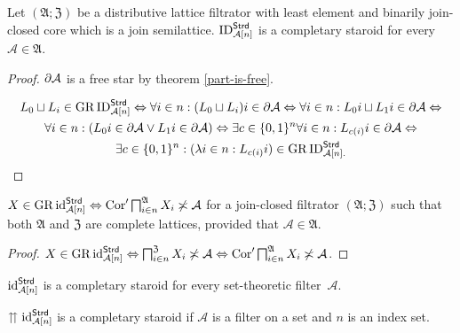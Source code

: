 \begin{prop}
\label{ID-completary}Let $(\mathfrak{A};\mathfrak{Z})$ be a distributive
lattice filtrator with least element and binarily join-closed core
which is a join semilattice. $\operatorname{ID}_{\mathcal{A}[n]}^{\mathsf{Strd}}$
is a completary staroid for every $\mathcal{A}\in\mathfrak{A}$.\end{prop}
\begin{proof}
$\partial\mathcal{A}$ is a free star by theorem \ref{part-is-free}.

\begin{multline*}
L_{0}\sqcup L_{i}\in\operatorname{GR}\operatorname{ID}_{\mathcal{A}[n]}^{\mathsf{Strd}}\Leftrightarrow\forall i\in n:(L_{0}\sqcup L_{i})i\in\partial\mathcal{A}\Leftrightarrow\forall i\in n:L_{0}i\sqcup L_{1}i\in\partial\mathcal{A}\Leftrightarrow\\
\forall i\in n:(L_{0}i\in\partial\mathcal{A}\vee L_{1}i\in\partial\mathcal{A})\Leftrightarrow\exists c\in\{0,1\}^{n}\forall i\in n:L_{c(i)}i\in\partial\mathcal{A}\Leftrightarrow\\
\exists c\in\{0,1\}^{n}:(\lambda i\in n:L_{c(i)}i)\in\operatorname{GR}\operatorname{ID}_{\mathcal{A}[n].}^{\mathsf{Strd}}
\end{multline*}
\end{proof}
\begin{lem}
$X\in\operatorname{GR}\operatorname{id}_{\mathcal{A}[n]}^{\mathsf{Strd}}\Leftrightarrow\operatorname{Cor}'\bigsqcap_{i\in n}^{\mathfrak{A}}X_{i}\not\asymp\mathcal{A}$
for a join-closed filtrator $(\mathfrak{A};\mathfrak{Z})$ such that
both $\mathfrak{A}$ and $\mathfrak{Z}$ are complete lattices, provided
that $\mathcal{A}\in\mathfrak{A}$.\end{lem}
\begin{proof}
$X\in\operatorname{GR}\operatorname{id}_{\mathcal{A}[n]}^{\mathsf{Strd}}\Leftrightarrow\bigsqcap_{i\in n}^{\mathfrak{Z}}X_{i}\not\asymp\mathcal{A}\Leftrightarrow\operatorname{Cor}'\bigsqcap_{i\in n}^{\mathfrak{A}}X_{i}\not\asymp\mathcal{A}$.\end{proof}
\begin{conjecture}
$\operatorname{id}_{\mathcal{A}[n]}^{\mathsf{Strd}}$ is a completary staroid for
every set-theoretic filter~$\mathcal{A}$.
\end{conjecture}
\begin{conjecture}
$\upuparrows\operatorname{id}_{\mathcal{A}[n]}^{\mathsf{Strd}}$ is a completary
staroid if $\mathcal{A}$ is a filter on a set and $n$ is an index
set.
\end{conjecture}

